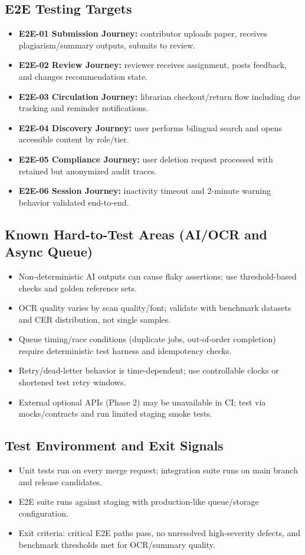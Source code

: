\documentclass[12pt,a4paper]{article}
\begin{document}
\subsection*{E2E Testing Targets}
\begin{itemize}
    \item \textbf{E2E-01 Submission Journey:} contributor uploads paper, receives plagiarism/summary outputs, submits to review.
    \item \textbf{E2E-02 Review Journey:} reviewer receives assignment, posts feedback, and changes recommendation state.
    \item \textbf{E2E-03 Circulation Journey:} librarian checkout/return flow including due tracking and reminder notifications.
    \item \textbf{E2E-04 Discovery Journey:} user performs bilingual search and opens accessible content by role/tier.
    \item \textbf{E2E-05 Compliance Journey:} user deletion request processed with retained but anonymized audit traces.
    \item \textbf{E2E-06 Session Journey:} inactivity timeout and 2-minute warning behavior validated end-to-end.
\end{itemize}

\subsection*{Known Hard-to-Test Areas (AI/OCR and Async Queue)}
\begin{itemize}
    \item Non-deterministic AI outputs can cause flaky assertions; use threshold-based checks and golden reference sets.
    \item OCR quality varies by scan quality/font; validate with benchmark datasets and CER distribution, not single samples.
    \item Queue timing/race conditions (duplicate jobs, out-of-order completion) require deterministic test harness and idempotency checks.
    \item Retry/dead-letter behavior is time-dependent; use controllable clocks or shortened test retry windows.
    \item External optional APIs (Phase 2) may be unavailable in CI; test via mocks/contracts and run limited staging smoke tests.
\end{itemize}

\subsection*{Test Environment and Exit Signals}
\begin{itemize}
    \item Unit tests run on every merge request; integration suite runs on main branch and release candidates.
    \item E2E suite runs against staging with production-like queue/storage configuration.
    \item Exit criteria: critical E2E paths pass, no unresolved high-severity defects, and benchmark thresholds met for OCR/summary quality.
\end{itemize}
\end{document}

